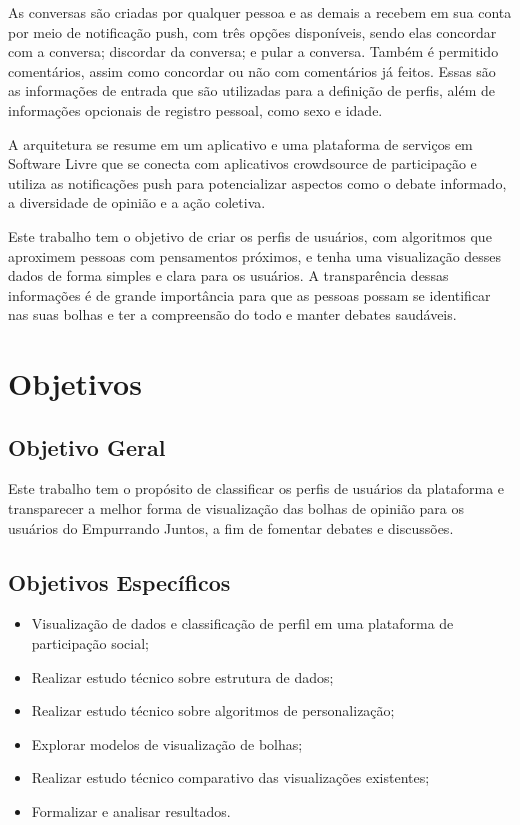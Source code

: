 As conversas são criadas por qualquer pessoa e as demais a recebem em sua conta por meio de notificação push, com três opções disponíveis, sendo elas concordar com a conversa; discordar da conversa; e pular a conversa. Também é permitido comentários, assim como concordar ou não com comentários já feitos. Essas são as informações de entrada que são utilizadas para a definição de perfis, além de informações opcionais de registro pessoal, como sexo e idade. 

A arquitetura se resume em um aplicativo e uma plataforma de serviços em Software Livre que se conecta com aplicativos crowdsource de participação e utiliza as notificações push para potencializar aspectos como o debate informado, a diversidade de opinião e a ação coletiva.

Este trabalho tem o objetivo de criar os perfis de usuários, com algoritmos que aproximem pessoas com pensamentos próximos, e tenha uma visualização desses dados de forma simples e clara para os usuários. A transparência dessas informações é de grande importância para que as pessoas possam se identificar nas suas bolhas e ter a compreensão do todo e manter debates saudáveis.

\section{Objetivos}

\subsection{Objetivo Geral}

Este trabalho tem o propósito de classificar os perfis de usuários da plataforma e transparecer a melhor forma de visualização das bolhas de opinião para os usuários do Empurrando Juntos, a fim de fomentar debates e discussões.

\subsection{Objetivos Específicos}

\begin{itemize}
	\item Visualização de dados e classificação de perfil em uma plataforma de participação social;
	\item Realizar estudo técnico sobre estrutura de dados;
	\item Realizar estudo técnico sobre algoritmos de personalização;
	\item Explorar modelos de visualização de bolhas;
	\item Realizar estudo técnico comparativo das visualizações existentes;
	\item Formalizar e analisar resultados.
\end{itemize}

